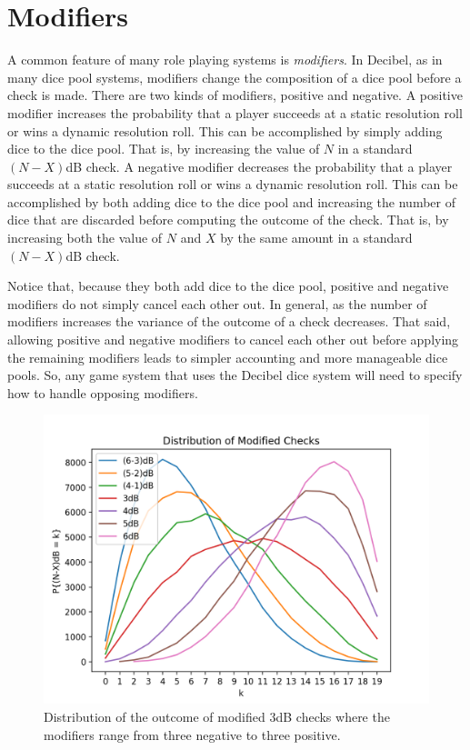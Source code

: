 \documentclass{scrartcl}
\begin{document}
\newpage

\section{Modifiers}
A common feature of many role playing systems is \emph{modifiers}.  In Decibel, as in many dice pool systems, modifiers change the composition of a dice pool before a check is made.  There are two kinds of modifiers, positive and negative.  A positive modifier increases the probability that a player succeeds at a static resolution roll or wins a dynamic resolution roll.  This can be accomplished by simply adding dice to the dice pool. That is, by increasing the value of $N$ in a standard $(N-X)$dB check.  A negative modifier decreases the probability that a player succeeds at a static resolution roll or wins a dynamic resolution roll. This can be accomplished by both adding dice to the dice pool and increasing the number of dice that are discarded before computing the outcome of the check.  That is, by increasing both the value of $N$ and $X$ by the same amount in a standard $(N-X)$dB check.

Notice that, because they both add dice to the dice pool, positive and negative modifiers do not simply cancel each other out.  In general, as the number of modifiers increases the variance of the outcome of a check decreases. That said, allowing positive and negative modifiers to cancel each other out before applying the remaining modifiers leads to simpler accounting and more manageable dice pools. So, any game system that uses the Decibel dice system will need to specify how to handle opposing modifiers.

\begin{figure}[ht]
\centering
\includegraphics[scale=0.8]{modified_distributions.png}
\caption{Distribution of the outcome of modified $3$dB checks where the modifiers range from three negative to three positive.}
\end{figure}
\end{document}
